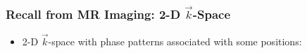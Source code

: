 %
%
%
%
%
%
%
%
%
%
%

\begin{frame}
	\frametitle{Recall from MR Imaging: 2-D $\vec k$-Space}

	\begin{itemize}
		\item 2-D $\vec k$-space with phase patterns associated with some positions:
	\end{itemize}

	\vspace{-2ex}

	\begin{center}
		
	\end{center}
\end{frame}

